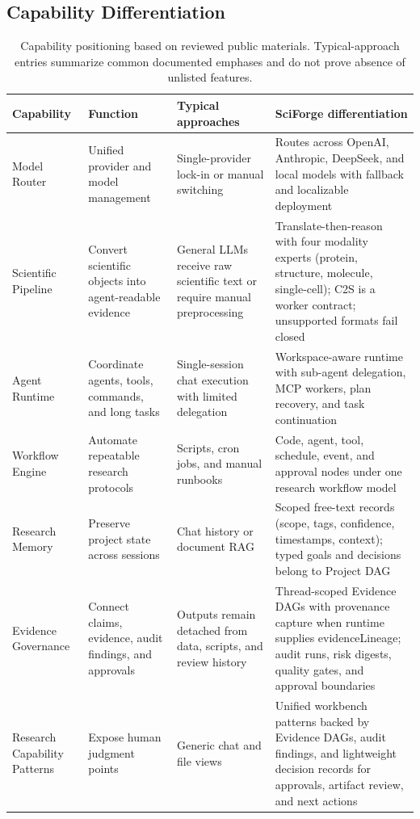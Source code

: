 \documentclass[sn-basic,Numbered,pdflatex]{sn-jnl}
\begin{document}
\clearpage
\begin{appendices}
\renewcommand{\theHtable}{A.\arabic{table}}

\section{Capability Differentiation}

\begin{table}[ht!]
\caption{Capability positioning based on reviewed public materials. Typical-approach entries summarize common documented emphases and do not prove absence of unlisted features.}
\label{tab:capability_differentiation}
\scriptsize
\centering
\setlength{\tabcolsep}{3pt}
\renewcommand{\arraystretch}{1.15}
\begin{tabular}{@{}L{2.2cm} L{2.7cm} L{3.0cm} L{3.5cm}@{}}
\toprule
\textbf{Capability} & \textbf{Function} & \textbf{Typical approaches} & \textbf{SciForge differentiation} \\
\midrule
Model Router
& Unified provider and model management
& Single-provider lock-in or manual switching
& Routes across OpenAI, Anthropic, DeepSeek, and local models with fallback and localizable deployment \\
Scientific Pipeline
& Convert scientific objects into agent-readable evidence
& General LLMs receive raw scientific text or require manual preprocessing
& Translate-then-reason with four modality experts (protein, structure, molecule, single-cell); C2S is a worker contract; unsupported formats fail closed \\
Agent Runtime
& Coordinate agents, tools, commands, and long tasks
& Single-session chat execution with limited delegation
& Workspace-aware runtime with sub-agent delegation, MCP workers, plan recovery, and task continuation \\
Workflow Engine
& Automate repeatable research protocols
& Scripts, cron jobs, and manual runbooks
& Code, agent, tool, schedule, event, and approval nodes under one research workflow model \\
Research Memory
& Preserve project state across sessions
& Chat history or document RAG
& Scoped free-text records (scope, tags, confidence, timestamps, context); typed goals and decisions belong to Project DAG \\
Evidence Governance
& Connect claims, evidence, audit findings, and approvals
& Outputs remain detached from data, scripts, and review history
& Thread-scoped Evidence DAGs with provenance capture when runtime supplies evidenceLineage; audit runs, risk digests, quality gates, and approval boundaries \\
Research Capability Patterns
& Expose human judgment points
& Generic chat and file views
& Unified workbench patterns backed by Evidence DAGs, audit findings, and lightweight decision records for approvals, artifact review, and next actions \\
\bottomrule
\end{tabular}
\end{table}
\clearpage

\end{appendices}
\end{document}
